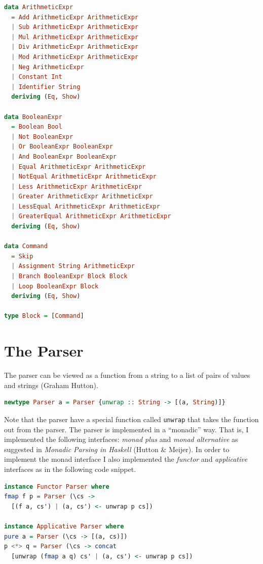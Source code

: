 \documentclass[12pt,a4paper]{article}
\begin{document}
\begin{lstlisting}[language=Haskell, style=custom-style]
data ArithmeticExpr
  = Add ArithmeticExpr ArithmeticExpr
  | Sub ArithmeticExpr ArithmeticExpr
  | Mul ArithmeticExpr ArithmeticExpr
  | Div ArithmeticExpr ArithmeticExpr
  | Mod ArithmeticExpr ArithmeticExpr
  | Neg ArithmeticExpr
  | Constant Int
  | Identifier String
  deriving (Eq, Show)

data BooleanExpr
  = Boolean Bool
  | Not BooleanExpr
  | Or BooleanExpr BooleanExpr
  | And BooleanExpr BooleanExpr
  | Equal ArithmeticExpr ArithmeticExpr
  | NotEqual ArithmeticExpr ArithmeticExpr
  | Less ArithmeticExpr ArithmeticExpr
  | Greater ArithmeticExpr ArithmeticExpr
  | LessEqual ArithmeticExpr ArithmeticExpr
  | GreaterEqual ArithmeticExpr ArithmeticExpr
  deriving (Eq, Show)

data Command
  = Skip
  | Assignment String ArithmeticExpr
  | Branch BooleanExpr Block Block
  | Loop BooleanExpr Block
  deriving (Eq, Show)

type Block = [Command]
\end{lstlisting}

\section*{The Parser}
The parser can be viewed as a function from a string to a list of pairs of values and strings (Graham Hutton).
\begin{lstlisting}[language=Haskell, style=custom-style]
newtype Parser a = Parser {unwrap :: String -> [(a, String)]}
\end{lstlisting}
Note that the parser have a special function called \texttt{unwrap} that takes the function out from the parser.
The parser is implemented in a ``monadic'' way.
That is, I implemented the following interfaces: \textit{monad plus} and \textit{monad alternative} as suggested in \textit{Monadic Parsing in Haskell} (Hutton \& Meijer).
In order to implement the monad interface I also implemented the \textit{functor} and \textit{applicative} interfaces as in the following code snippet.
\begin{lstlisting}[language=Haskell, style=custom-style]
instance Functor Parser where
fmap f p = Parser (\cs ->
  [(f a, cs') | (a, cs') <- unwrap p cs])

instance Applicative Parser where
pure a = Parser (\cs -> [(a, cs)])
p <*> q = Parser (\cs -> concat
  [unwrap (fmap a q) cs' | (a, cs') <- unwrap p cs])
\end{lstlisting}
\end{document}

